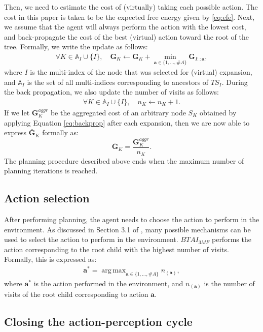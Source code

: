 \documentclass[twoside,11pt]{article}
\DeclareMathOperator*{\argmax}{arg\,max}
\newcommand{\nb}[1]{\# #1}
\begin{document}
Then, we need to estimate the cost of (virtually) taking each possible action. The cost in this paper is taken to be the expected free energy given by \eqref{eq:efe}. Next, we assume that the agent will always perform the action with the lowest cost, and back-propagate the cost of the best (virtual) action toward the root of the tree. Formally, we write the update as follows:
\begin{align}\label{eq:backprop}
\forall K \in \mathbb{A}_I \cup \{I\}, \quad \bm{G}_K \leftarrow \bm{G}_K + \min_{\bm{a} \in \{1, ..., \nb{A}\}} \bm{G}_{I{::}\bm{a}},
\end{align}
where $I$ is the multi-index of the node that was selected for (virtual) expansion, and $\mathbb{A}_I$ is the set of all multi-indices corresponding to ancestors of $TS_I$. During the back propagation, we also update the number of visits as follows:
\begin{align}\label{eq:backprop_n}
\forall K \in \mathbb{A}_I \cup \{I\}, \quad n_K \leftarrow n_K + 1.
\end{align}
If we let $\bm{G}^{aggr}_K$ be the aggregated cost of an arbitrary node $S_K$ obtained by applying Equation \ref{eq:backprop} after each expansion, then we are now able to express $\bar{\bm{G}}_K$ formally as:
$$\bar{\bm{G}}_K = \frac{\bm{G}^{aggr}_K}{n_K}.$$
The planning procedure described above ends when the maximum number of planning iterations is reached.

\subsection{Action selection} \label{ssec:action_selection}

After performing planning, the agent needs to choose the action to perform in the environment. As discussed in Section 3.1 of \citep{MCTS}, many possible mechanisms can be used to select the action to perform in the environment. $BTAI_{3MF}$ performs the action corresponding to the root child with the highest number of visits. Formally, this is expressed as:
\begin{align}\label{eq:action_selection}
\bm{a}^* = \argmax_{\bm{a} \in \{1, ..., \nb{A}\}} n_{(\bm{a})},
\end{align}
where $\bm{a}^*$ is the action performed in the environment, and $n_{(\bm{a})}$ is the number of visits of the root child corresponding to action $\bm{a}$.

\subsection{Closing the action-perception cycle}
\end{document}

